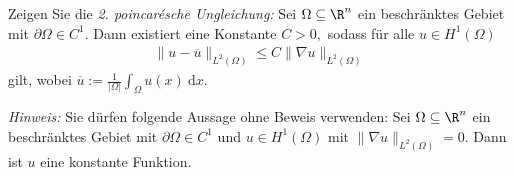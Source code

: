 
\begin{exercise}

  Zeigen Sie die \textit{2. poincarésche Ungleichung:} Sei $\Omega \subseteq \R^n$ ein beschränktes Gebiet mit $\partial\Omega \in C^1.$ Dann existiert eine Konstante $C > 0,$ sodass für alle $u \in H^1(\Omega)$
  \begin{align*}
      \| u - \overline{u} \|_{L^2(\Omega)} \leq C \| \nabla u \|_{L^2(\Omega)}
  \end{align*}
  gilt, wobei $\overline{u} := \frac{1}{|\Omega|} \int_\Omega u(x) \mathrm{~d}x$.

  \textit{Hinweis:} Sie dürfen folgende Aussage ohne Beweis verwenden: Sei $\Omega \subseteq \R^n$ ein beschränktes Gebiet mit $\partial\Omega \in C^1$ und $u \in H^1(\Omega)$
  mit $\| \nabla u \|_{L^2(\Omega)} = 0.$ Dann ist $u$ eine konstante Funktion.

\end{exercise}


